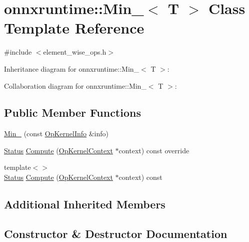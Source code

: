 \hypertarget{classonnxruntime_1_1Min__8}{}\section{onnxruntime\+:\+:Min\+\_$<$ T $>$ Class Template Reference}
\label{classonnxruntime_1_1Min__8}


{\ttfamily \#include $<$element\+\_\+wise\+\_\+ops.\+h$>$}



Inheritance diagram for onnxruntime\+:\+:Min\+\_$<$ T $>$\+:


Collaboration diagram for onnxruntime\+:\+:Min\+\_$<$ T $>$\+:
\subsection*{Public Member Functions}
\begin{DoxyCompactItemize}
\item 
\mbox{\hyperlink{classonnxruntime_1_1Min__8_af4f188edb57cbc85185d3bc0814ee7fc}{Min\+\_}} (const \mbox{\hyperlink{classonnxruntime_1_1OpKernelInfo}{Op\+Kernel\+Info}} \&info)
\item 
\mbox{\hyperlink{classonnxruntime_1_1common_1_1Status}{Status}} \mbox{\hyperlink{classonnxruntime_1_1Min__8_a3622550b5f98e65523ae4bc61b87ac1d}{Compute}} (\mbox{\hyperlink{classonnxruntime_1_1OpKernelContext}{Op\+Kernel\+Context}} $\ast$context) const override
\item 
{\footnotesize template$<$$>$ }\\\mbox{\hyperlink{classonnxruntime_1_1common_1_1Status}{Status}} \mbox{\hyperlink{classonnxruntime_1_1Min__8_a519e26ba4e9ddc6074919556affc1e71}{Compute}} (\mbox{\hyperlink{classonnxruntime_1_1OpKernelContext}{Op\+Kernel\+Context}} $\ast$context) const
\end{DoxyCompactItemize}
\subsection*{Additional Inherited Members}


\subsection{Constructor \& Destructor Documentation}
\mbox{\label{classonnxruntime_1_1Min__8_af4f188edb57cbc85185d3bc0814ee7fc}} 
